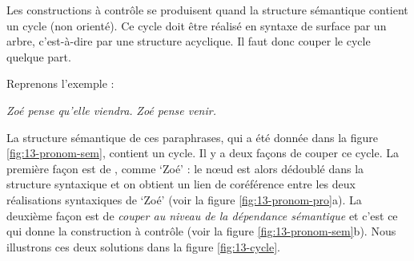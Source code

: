 Les constructions à contrôle se produisent quand la structure sémantique contient un cycle (non orienté). Ce cycle doit être réalisé en syntaxe de surface par un arbre, c’est-à-dire par une structure acyclique. Il faut donc couper le cycle quelque part.

Reprenons l’exemple  :

\ea\label{ex:13-cycle}
\ea \textit{Zoé pense qu’elle viendra.}
\ex \textit{Zoé pense venir.}\z\z

La structure sémantique de ces paraphrases, qui a été donnée dans la figure \ref{fig:13-pronom-sem}, contient un cycle. Il y a deux façons de couper ce cycle. La première façon est de , comme ‘Zoé’ : le nœud est alors dédoublé dans la structure syntaxique et on obtient un lien de coréférence entre les deux réalisations syntaxiques de ‘Zoé’ (voir la figure \ref{fig:13-pronom-pro}a). La deuxième façon est de \textit{couper au niveau de la dépendance sémantique} et c’est ce qui donne la construction à contrôle (voir la figure \ref{fig:13-pronom-sem}b). Nous illustrons ces deux solutions dans la figure \ref{fig:13-cycle}.

